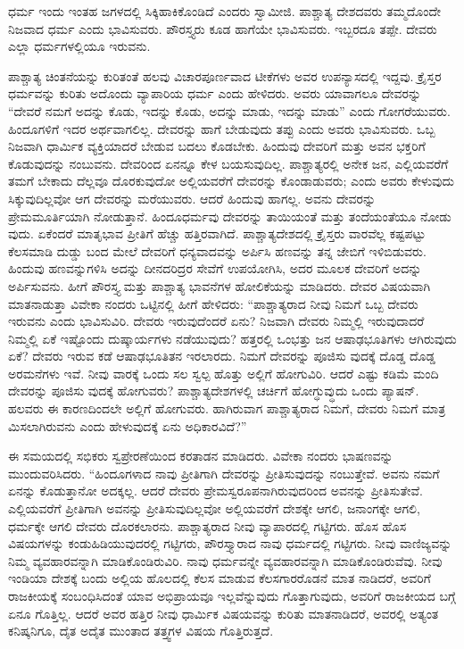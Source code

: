 ಧರ್ಮ ಇಂದು ಇಂತಹ ಜಗಳದಲ್ಲಿ ಸಿಕ್ಕಿಹಾಕಿಕೊಂಡಿದೆ ಎಂದರು ಸ್ವಾಮೀಜಿ. ಪಾಶ್ಚಾತ್ಯ ದೇಶದವರು ತಮ್ಮದೊಂದೇ ನಿಜವಾದ ಧರ್ಮ ಎಂದು ಭಾವಿಸುವರು. ಪೌರಸ್ತ್ಯರು ಕೂಡ ಹಾಗೆಯೇ ಭಾವಿಸುವರು. ಇಬ್ಬರದೂ ತಪ್ಪೇ. ದೇವರು ಎಲ್ಲಾ ಧರ್ಮಗಳಲ್ಲಿಯೂ ಇರುವನು.

ಪಾಶ್ಚಾತ್ಯ ಚಿಂತನೆಯನ್ನು ಕುರಿತಂತೆ ಹಲವು ವಿಚಾರಪೂರ್ಣವಾದ ಟೀಕೆಗಳು ಅವರ ಉಪನ್ಯಾಸದಲ್ಲಿ ಇದ್ದವು. ಕ್ರೈಸ್ತರ ಧರ್ಮವನ್ನು ಕುರಿತು ಅದೊಂದು ವ್ಯಾಪಾರಿಯ ಧರ್ಮ ಎಂದು ಹೇಳಿದರು. ಅವರು ಯಾವಾಗಲೂ ದೇವರನ್ನು “ದೇವರೆ ನಮಗೆ ಅದನ್ನು ಕೊಡು, ಇದನ್ನು ಕೊಡು, ಅದನ್ನು ಮಾಡು, ಇದನ್ನು ಮಾಡು” ಎಂದು ಗೋಗರೆಯುವರು. ಹಿಂದೂಗಳಿಗೆ ಇದರ ಅರ್ಥವಾಗಲಿಲ್ಲ. ದೇವರನ್ನು ಹಾಗೆ ಬೇಡುವುದು ತಪ್ಪು ಎಂದು ಅವರು ಭಾವಿಸುವರು. ಒಬ್ಬ ನಿಜವಾಗಿ ಧಾರ್ಮಿಕ ವ್ಯಕ್ತಿಯಾದರೆ ಬೇಡುವ ಬದಲು ಕೊಡಬೇಕು. ಹಿಂದುವು ದೇವರಿಗೆ ಮತ್ತು ಅವನ ಭಕ್ತರಿಗೆ ಕೊಡುವುದನ್ನು ನಂಬುವನು. ದೇವರಿಂದ ಏನನ್ನೂ ಕೇಳ ಬಯಸುವುದಿಲ್ಲ. ಪಾಶ್ಚಾತ್ಯರಲ್ಲಿ ಅನೇಕ ಜನ, ಎಲ್ಲಿಯವರೆಗೆ ತಮಗೆ ಬೇಕಾದು ದೆಲ್ಲವೂ ದೊರಕುವುದೋ ಅಲ್ಲಿಯವರೆಗೆ ದೇವರನ್ನು ಕೊಂಡಾಡುವರು; ಎಂದು ಅವರು ಕೇಳುವುದು ಸಿಕ್ಕುವುದಿಲ್ಲವೋ ಆಗ ದೇವರನ್ನು ಮರೆಯುವರು. ಆದರೆ ಹಿಂದುವು ಹಾಗಲ್ಲ. ಅವನು ದೇವರನ್ನು ಪ್ರೇಮಮೂರ್ತಿಯಾಗಿ ನೋಡುತ್ತಾನೆ. ಹಿಂದೂಧರ್ಮವು ದೇವರನ್ನು ತಾಯಿಯಂತೆ ಮತ್ತು ತಂದೆಯಂತೆಯೂ ನೋಡು ವುದು. ಏಕೆಂದರೆ ಮಾತೃಭಾವ ಪ್ರೀತಿಗೆ ಹೆಚ್ಚು ಹತ್ತಿರವಾಗಿದೆ. ಪಾಶ್ಚಾತ್ಯದೇಶದಲ್ಲಿ ಕ್ರೈಸ್ತರು ವಾರವೆಲ್ಲ ಕಷ್ಟಪಟ್ಟು ಕೆಲಸಮಾಡಿ ದುಡ್ಡು ಬಂದ ಮೇಲೆ ದೇವರಿಗೆ ಧನ್ಯವಾದವನ್ನು ಅರ್ಪಿಸಿ ಹಣವನ್ನು ತನ್ನ ಜೇಬಿಗೆ ಇಳಿಬಿಡುವರು. ಹಿಂದುವು ಹಣವನ್ನುಗಳಿಸಿ ಅದನ್ನು ದೀನದರಿದ್ರರ ಸೇವೆಗೆ ಉಪಯೋಗಿಸಿ, ಅದರ ಮೂಲಕ ದೇವರಿಗೆ ಅದನ್ನು ಅರ್ಪಿಸುವನು. ಹೀಗೆ ಪೌರಸ್ತ್ಯ ಮತ್ತು ಪಾಶ್ಚಾತ್ಯ ಭಾವನೆಗಳ ಹೋಲಿಕೆಯನ್ನು ಮಾಡಿದರು. ದೇವರ ವಿಷಯವಾಗಿ ಮಾತನಾಡುತ್ತಾ ವಿವೇಕಾ ನಂದರು ಒಟ್ಟಿನಲ್ಲಿ ಹೀಗೆ ಹೇಳಿದರು: “ಪಾಶ್ಚಾತ್ಯರಾದ ನೀವು ನಿಮಗೆ ಒಬ್ಬ ದೇವರು ಇರುವನು ಎಂದು ಭಾವಿಸುವಿರಿ. ದೇವರು ಇರುವುದೆಂದರೆ ಏನು? ನಿಜವಾಗಿ ದೇವರು ನಿಮ್ಮಲ್ಲಿ ಇರುವುದಾದರೆ ನಿಮ್ಮಲ್ಲಿ ಏಕೆ ಇಷ್ಟೊಂದು ದುಷ್ಕಾರ್ಯಗಳು ನಡೆಯುವುದು? ಹತ್ತರಲ್ಲಿ ಒಂಭತ್ತು ಜನ ಆಷಾಢಭೂತಿಗಳು ಆಗಿರುವುದು ಏಕೆ? ದೇವರು ಇರುವ ಕಡೆ ಆಷಾಢಭೂತಿತನ ಇರಲಾರದು. ನಿಮಗೆ ದೇವರನ್ನು ಪೂಜಿಸು ವುದಕ್ಕೆ ದೊಡ್ಡ ದೊಡ್ಡ ಅರಮನೆಗಳು ಇವೆ. ನೀವು ವಾರಕ್ಕೆ ಒಂದು ಸಲ ಸ್ವಲ್ಪ ಹೊತ್ತು ಅಲ್ಲಿಗೆ ಹೋಗುವಿರಿ. ಆದರೆ ಎಷ್ಟು ಕಡಿಮೆ ಮಂದಿ ದೇವರನ್ನು ಪೂಜಿಸು ವುದಕ್ಕೆ ಹೋಗುವರು? ಪಾಶ್ಚಾತ್ಯದೇಶಗಳಲ್ಲಿ ಚರ್ಚಿಗೆ ಹೋಗ್ಧುವ್ಧುದು ಒಂದು ಪ್ಯಾಷನ್. ಹಲವರು ಈ ಕಾರಣದಿಂದಲೇ ಅಲ್ಲಿಗೆ ಹೋಗುವರು. ಹಾಗಿರುವಾಗ ಪಾಶ್ಚಾತ್ಯರಾದ ನಿಮಗೆ, ದೇವರು ನಿಮಗೆ ಮಾತ್ರ ಮಿಸಲಾಗಿರುವನು ಎಂದು ಹೇಳುವುದಕ್ಕೆ ಏನು ಅಧಿಕಾರವಿದೆ?''

ಈ ಸಮಯದಲ್ಲಿ ಸಭಿಕರು ಸ್ವಪ್ರೇರಣೆಯಿಂದ ಕರತಾಡನ ಮಾಡಿದರು. ವಿವೇಕಾ ನಂದರು ಭಾಷಣವನ್ನು ಮುಂದುವರಿಸಿದರು. “ಹಿಂದೂಗಳಾದ ನಾವು ಪ್ರೀತಿಗಾಗಿ ದೇವರನ್ನು ಪ್ರೀತಿಸುವುದನ್ನು ನಂಬುತ್ತೇವೆ. ಅವನು ನಮಗೆ ಏನನ್ನು ಕೊಡುತ್ತಾನೋ ಅದಕ್ಕಲ್ಲ. ಆದರೆ ದೇವರು ಪ್ರೇಮಸ್ವರೂಪನಾಗಿರುವುದರಿಂದ ಅವನನ್ನು ಪ್ರೀತಿಸುತೇವೆ. ಎಲ್ಲಿಯವರೆಗೆ ಪ್ರೀತಿಗಾಗಿ ಅವನನ್ನು ಪ್ರೀತಿಸುವುದಿಲ್ಲವೋ ಅಲ್ಲಿಯವರೆಗೆ ದೇಶಕ್ಕೇ ಆಗಲಿ, ಜನಾಂಗಕ್ಕೇ ಆಗಲಿ, ಧರ್ಮಕ್ಕೇ ಆಗಲಿ ದೇವರು ದೊರಕಲಾರನು. ಪಾಶ್ಚಾತ್ಯರಾದ ನೀವು ವ್ಯಾಪಾರದಲ್ಲಿ ಗಟ್ಟಿಗರು. ಹೊಸ ಹೊಸ ವಿಷಯಗಳನ್ನು ಕಂಡುಹಿಡಿಯುವುದರಲ್ಲಿ ಗಟ್ಟಿಗರು, ಪೌರಸ್ತ್ಯಾರಾದ ನಾವು ಧರ್ಮದಲ್ಲಿ ಗಟ್ಟಿಗರು. ನೀವು ವಾಣಿಜ್ಯವನ್ನು ನಿಮ್ಮ ವ್ಯವಹಾರವನ್ನಾಗಿ ಮಾಡಿಕೊಂಡಿರುವಿರಿ. ನಾವು ಧರ್ಮವನ್ನೇ ವ್ಯವಹಾರವನ್ನಾಗಿ ಮಾಡಿಕೊಂಡಿರುವೆವು. ನೀವು ಇಂಡಿಯಾ ದೇಶಕ್ಕೆ ಬಂದು ಅಲ್ಲಿಯ ಹೊಲದಲ್ಲಿ ಕೆಲಸ ಮಾಡುವ ಕೆಲಸಗಾರರೊಡನೆ ಮಾತ ನಾಡಿದರೆ, ಅವರಿಗೆ ರಾಜಕೀಯಕ್ಕೆ ಸಂಬಂಧಿಸಿದಂತೆ ಯಾವ ಅಭಿಪ್ರಾಯವೂ ಇಲ್ಲವೆನ್ನುವುದು ಗೊತ್ತಾಗುವುದು, ಅವರಿಗೆ ರಾಜಕೀಯದ ಬಗ್ಗೆ ಏನೂ ಗೊತ್ತಿಲ್ಲ. ಆದರೆ ಅವರ ಹತ್ತಿರ ನೀವು ಧಾರ್ಮಿಕ ವಿಷಯವನ್ನು ಕುರಿತು ಮಾತನಾಡಿದರೆ, ಅವರಲ್ಲಿ ಅತ್ಯಂತ ಕನಿಷ್ಕನಿಗೂ, ದೈತ ಅದೈತ ಮುಂತಾದ ತತ್ತ್ವಗಳ ವಿಷಯ ಗೊತ್ತಿರುತ್ತದೆ.

